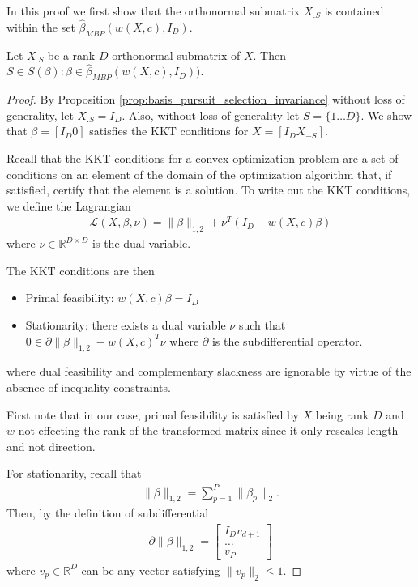 In this proof we first show that the orthonormal submatrix $X_{.S}$ is contained within the set $\widehat { \mathcal \beta}_{MBP} (w(X,c), I_D)$.

\begin{proposition}
\label{prop:kkt}
Let $X_{.S}$ be a rank $D$ orthonormal submatrix of $X$.
Then $S \in S(\beta) : \beta \in \widehat{ \mathcal \beta}_{MBP} (w(X,c), I_D))$.
 \end{proposition}
 
 \begin{proof}
 
 By Proposition \ref{prop:basis_pursuit_selection_invariance} without loss of generality, let $X_{.S} = I_D$.
 Also, without loss of generality let $S = \{1 \dotsc D\}$.
 We show that $\beta = [I_D 0]$ satisfies the KKT conditions for $X = [I_D X_{-S}]$.
 
Recall that the KKT conditions for a convex optimization problem are a set of conditions on an element of the domain of the optimization algorithm that, if satisfied, certify that the element is a solution.
To write out the KKT conditions, we define the Lagrangian
\begin{align}
\mathcal L(X,\beta,\nu) = \|\beta\|_{1,2} + \nu^T (I_D - w(X,c) \beta)
\end{align}
where $\nu \in \mathbb R^{D\times D}$ is the dual variable.

The KKT conditions are then
\begin{itemize}
\item Primal feasibility: $w(X, c) \beta = I_D$
\item Stationarity: there exists a dual variable $\nu$ such that $0 \in \partial \|\beta\|_{1,2} - w(X, c)^T \nu$  where $\partial$ is the subdifferential operator.
\end{itemize}
where dual feasibility and complementary slackness are ignorable by virtue of the absence of inequality constraints.

First note that in our case, primal feasibility is satisfied by $X$ being rank $D$ and $w$ not effecting the rank of the transformed matrix since it only rescales length and not direction.

For stationarity, recall that 
\begin{align}
\|\beta\|_{1,2} = \sum_{p = 1}^P \|\beta_{p.}\|_2.
\end{align}
Then, by the definition of subdifferential
\begin{align}
\partial \|\beta\|_{1,2} = \begin{bmatrix}
I_D
v_{d+1} \\
\dotsc \\
v_P
\end{bmatrix}
\end{align}
where $v_p \in \mathbb R^{D}$ can be any vector satisfying $\|v_p\|_2 \leq 1$.


\end{proof}
